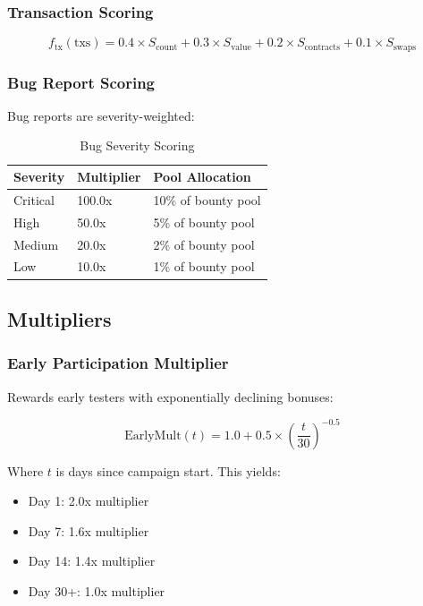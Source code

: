 \documentclass[11pt,a4paper]{article}
\begin{document}
\subsubsection{Transaction Scoring}

\begin{equation}
f_{\text{tx}}(\text{txs}) = 0.4 \times S_{\text{count}} + 0.3 \times S_{\text{value}} + 0.2 \times S_{\text{contracts}} + 0.1 \times S_{\text{swaps}}
\end{equation}

\subsubsection{Bug Report Scoring}

Bug reports are severity-weighted:

\begin{table}[h]
\centering
\begin{tabular}{|l|l|l|}
\hline
\textbf{Severity} & \textbf{Multiplier} & \textbf{Pool Allocation} \\ \hline
Critical          & 100.0x              & 10\% of bounty pool      \\ \hline
High              & 50.0x               & 5\% of bounty pool       \\ \hline
Medium            & 20.0x               & 2\% of bounty pool       \\ \hline
Low               & 10.0x               & 1\% of bounty pool       \\ \hline
\end{tabular}
\caption{Bug Severity Scoring}
\end{table}

\subsection{Multipliers}

\subsubsection{Early Participation Multiplier}

Rewards early testers with exponentially declining bonuses:

\begin{equation}
\text{EarlyMult}(t) = 1.0 + 0.5 \times \left(\frac{t}{30}\right)^{-0.5}
\end{equation}

Where $t$ is days since campaign start. This yields:
\begin{itemize}
    \item Day 1: 2.0x multiplier
    \item Day 7: 1.6x multiplier
    \item Day 14: 1.4x multiplier
    \item Day 30+: 1.0x multiplier
\end{itemize}
\end{document}
